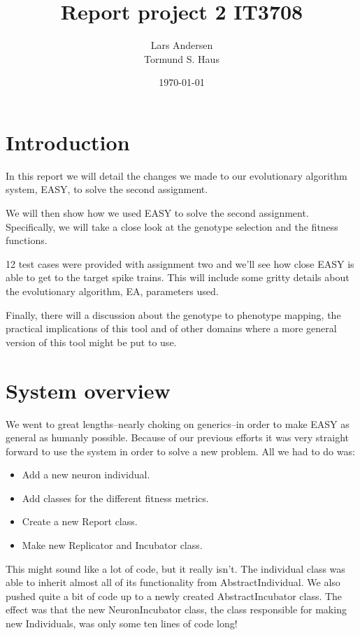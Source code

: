 \documentclass[a4paper]{article}
\title{Report project 2 IT3708}
\author{Lars Andersen \\
    Tormund S. Haus}
\date{\today}
\begin{document}
\maketitle

\section{Introduction}
\label{sec:introduction}

In this report we will detail the changes we made to our evolutionary algorithm system, EASY, to solve the second assignment.

We will then show how we used EASY to solve the second assignment. Specifically, we will take a close look at the genotype selection and the fitness functions.

12 test cases were provided with assignment two and we'll see how close EASY is able to get to the target spike trains. This will include some gritty details about the evolutionary algorithm, EA, parameters used.

Finally, there will a discussion about the genotype to phenotype mapping, the practical implications of this tool and of other domains where a more general version of this tool might be put to use.

\section{System overview}
\label{sec:system_overview}

We went to great lengths--nearly choking on generics--in order to make EASY as general as humanly possible. Because of our previous efforts it was very straight forward to use the system in order to solve a new problem. All we had to do was:

\begin{itemize}
\item Add a new neuron individual.
\item Add classes for the different fitness metrics.
\item Create a new Report class.
\item Make new Replicator and Incubator class.
\end{itemize}

This might sound like a lot of code, but it really isn't. The individual class was able to inherit almost all of its functionality from AbstractIndividual. We also pushed quite a bit of code up to a newly created AbstractIncubator class. The effect was that the new NeuronIncubator class, the class responsible for making new Individuals, was only some ten lines of code long!
\end{document}
